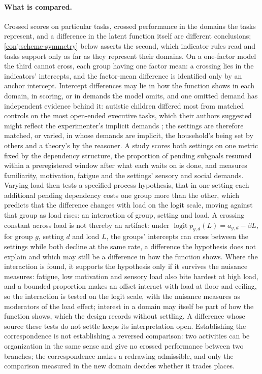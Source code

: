 \paragraph{What is compared.} Crossed scores on particular tasks, crossed performance in the domains the tasks represent, and a difference in the latent function itself are different conclusions; \autoref{conj:scheme-symmetry} below asserts the second, which indicator rules read and tasks support only as far as they represent their domains. On a one-factor model the third cannot cross, each group having one factor mean: a crossing lies in the indicators' intercepts, and the factor-mean difference is identified only by an anchor intercept. Intercept differences may lie in how the function shows in each domain, in scoring, or in demands the model omits, and one omitted demand has independent evidence behind it: autistic children differed most from matched controls on the most open-ended executive tasks, which their authors suggested might reflect the experimenter's implicit demands \cite{WhiteBurgessHill2009}; the settings are therefore matched, or varied, in whose demands are implicit, the household's being set by others and a theory's by the reasoner. A study scores both settings on one metric fixed by the dependency structure, the proportion of pending subgoals resumed within a preregistered window after what each waits on is done, and measures familiarity, motivation, fatigue and the settings' sensory and social demands. Varying load then tests a specified process hypothesis, that in one setting each additional pending dependency costs one group more than the other, which predicts that the difference changes with load on the logit scale, moving against that group as load rises: an interaction of group, setting and load. A crossing constant across load is not thereby an artifact: under $\operatorname{logit} p_{g,d}(L) = a_{g,d} - \beta L$, for group $g$, setting $d$ and load $L$, the groups' intercepts can cross between the settings while both decline at the same rate, a difference the hypothesis does not explain and which may still be a difference in how the function shows. Where the interaction is found, it supports the hypothesis only if it survives the nuisance measures: fatigue, low motivation and sensory load also bite hardest at high load, and a bounded proportion makes an offset interact with load at floor and ceiling, so the interaction is tested on the logit scale, with the nuisance measures as moderators of the load effect; interest in a domain may itself be part of how the function shows, which the design records without settling. A difference whose source these tests do not settle keeps its interpretation open. Establishing the correspondence is not establishing a reversed comparison: two activities can be organization in the same sense and give no crossed performance between two branches; the correspondence makes a redrawing admissible, and only the comparison measured in the new domain decides whether it trades places.

